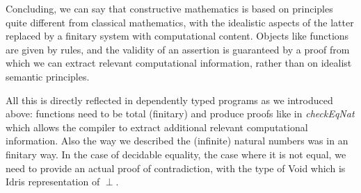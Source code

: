 Concluding, we can say that constructive mathematics is based on principles quite different from classical mathematics, with the idealistic aspects of the latter replaced by a finitary system with computational content. Objects like functions are given by rules, and the validity of an assertion is guaranteed by a proof from which we can extract relevant computational information, rather than on idealist semantic principles. 

All this is directly reflected in dependently typed programs as we introduced above: functions need to be total (finitary) and produce proofs like in \textit{checkEqNat} which allows the compiler to extract additional relevant computational information. Also the way we described the (infinite) natural numbers was in an finitary way. In the case of decidable equality, the case where it is not equal, we need to provide an actual proof of contradiction, with the type of Void which is Idris representation of $\perp$. 